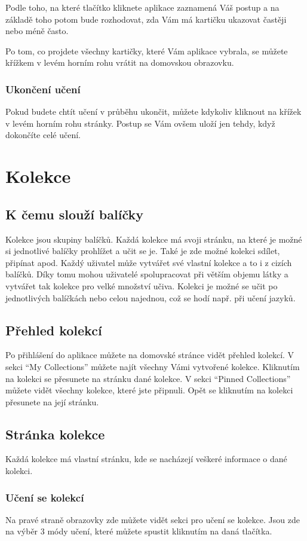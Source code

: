 \documentclass[a4paper,12pt]{article}
\begin{document}
Podle toho, na které tlačítko kliknete aplikace zaznamená Váš postup a na základě toho potom bude rozhodovat, zda Vám má kartičku ukazovat častěji nebo méně často.

Po tom, co projdete všechny kartičky, které Vám aplikace vybrala, se můžete křížkem v levém horním rohu vrátit na domovskou obrazovku.

\subsubsection*{Ukončení učení}
Pokud budete chtít učení v průběhu ukončit, můžete kdykoliv kliknout na křížek v levém horním rohu stránky. Postup se Vám ovšem uloží jen tehdy, když dokončíte celé učení.

\section{Kolekce}
\subsection{K čemu slouží balíčky}
Kolekce jsou skupiny balíčků. Každá kolekce má svoji stránku, na které je možné si jednotlivé balíčky prohlížet a učit se je. Také je zde možné kolekci sdílet, připínat apod. Každý uživatel může vytvářet své vlastní kolekce a to i z cizích balíčků. Díky tomu mohou uživatelé spolupracovat při větším objemu látky a vytvářet tak kolekce pro velké množství učiva. Kolekci je možné se učit po jednotlivých balíčkách nebo celou najednou, což se hodí např. při učení jazyků.

\subsection{Přehled kolekcí}
Po přihlášení do aplikace můžete na domovské stránce vidět přehled kolekcí. V sekci \enquote{My Collections} můžete najít všechny Vámi vytvořené kolekce. Kliknutím na kolekci se přesunete na stránku dané kolekce. V sekci \enquote{Pinned Collections} můžete vidět všechny kolekce, které jste připnuli. Opět se kliknutím na kolekci přesunete na její stránku.

\subsection{Stránka kolekce}
Každá kolekce má vlastní stránku, kde se nacházejí veškeré informace o dané kolekci.

\subsubsection*{Učení se kolekcí}
Na pravé straně obrazovky zde můžete vidět sekci pro učení se kolekce. Jsou zde na výběr 3 módy učení, které můžete spustit kliknutím na daná tlačítka.
\end{document}
